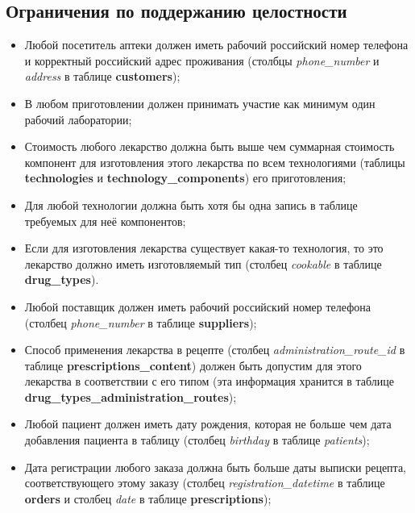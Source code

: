 \documentclass[a4paper]{article}
\newcommand{\dbtable}[1]{\textbf{#1}}
\newcommand{\dbtableref}[1]{\textit{#1}}
\begin{document}
		\subsection{Ограничения по поддержанию целостности}
			\begin{itemize}
				\item Любой посетитель аптеки должен иметь рабочий российский номер телефона и корректный российский адрес проживания (столбцы \dbtableref{phone\_number} и \dbtableref{address} в таблице \dbtable{customers}); 
				
				\item В любом приготовлении должен принимать участие как минимум один рабочий лаборатории;
				
				\item Стоимость любого лекарство должна быть выше чем суммарная стоимость компонент для изготовления этого лекарства по всем технологиями (таблицы \dbtable{technologies} и \dbtable{technology\_components}) его приготовления;
				
				\item Для любой технологии должна быть хотя бы одна запись в таблице требуемых для неё компонентов;
				
				\item Если для изготовления лекарства существует какая-то технология, то это лекарство должно иметь изготовляемый тип (столбец \dbtableref{cookable} в таблице \dbtable{drug\_types}).
				
				\item Любой поставщик должен иметь рабочий российский номер телефона \newline (столбец \dbtableref{phone\_number} в таблице \dbtable{suppliers});
				
				\item Способ применения лекарства в рецепте (столбец \dbtableref{administration\_route\_id} в таблице \dbtable{prescriptions\_content}) должен быть допустим для этого лекарства в соответствии с его типом (эта информация хранится в таблице \dbtable{drug\_types\_administration\_routes});
				
				\item Любой пациент должен иметь дату рождения, которая не больше чем дата добавления пациента в таблицу (столбец \dbtableref{birthday} в таблице \dbtableref{patients});
				
				\item Дата регистрации любого заказа должна быть больше даты выписки рецепта, соответствующего этому заказу (столбец \dbtableref{registration\_datetime} в таблице \dbtable{orders} и столбец \dbtableref{date} в таблице \dbtable{prescriptions});
				

\end{itemize}
\end{document}
